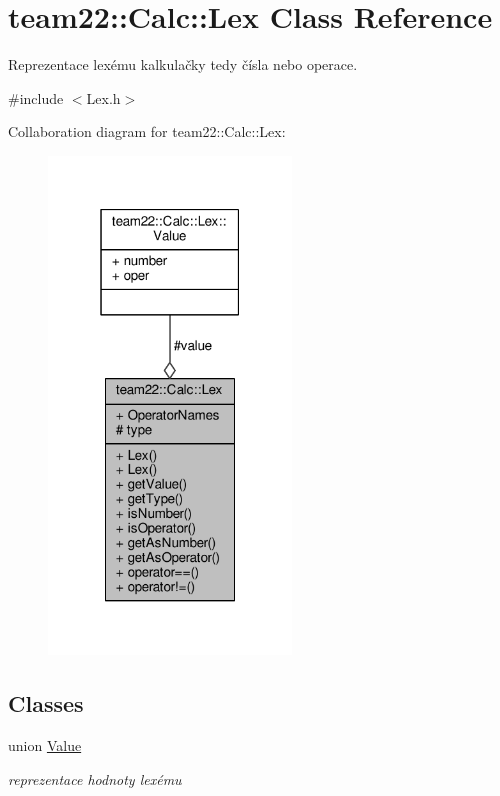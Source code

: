 \hypertarget{classteam22_1_1_calc_1_1_lex}{}\section{team22\+:\+:Calc\+:\+:Lex Class Reference}
\label{classteam22_1_1_calc_1_1_lex}


Reprezentace lexému kalkulačky tedy čísla nebo operace.  




{\ttfamily \#include $<$Lex.\+h$>$}



Collaboration diagram for team22\+:\+:Calc\+:\+:Lex\+:
\nopagebreak
\begin{figure}[H]
\begin{center}
\leavevmode
\includegraphics[width=183pt]{classteam22_1_1_calc_1_1_lex__coll__graph}
\end{center}
\end{figure}
\subsection*{Classes}
\begin{DoxyCompactItemize}
\item 
union \hyperlink{unionteam22_1_1_calc_1_1_lex_1_1_value}{Value}
\begin{DoxyCompactList}\small\item\em reprezentace hodnoty lexému \end{DoxyCompactList}\end{DoxyCompactItemize}
